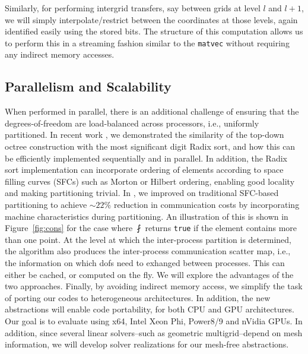 Similarly, for performing intergrid transfers, say between grids at level $l$ and $l+1$, we will simply interpolate/restrict between the coordinates at those levels, again identified easily using the stored bits. The structure of this computation allows us to perform this in a streaming fashion similar to the \texttt{matvec} without requiring any indirect memory accesses. 





\subsection{Parallelism and Scalability}

When performed in parallel, there is an additional challenge of ensuring that the degrees-of-freedom are load-balanced across processors, i.e., uniformly partitioned. In recent work \cite{FernandoDuplyakinSundar17}, we demonstrated the similarity of the top-down octree construction with the most significant digit Radix sort, and how this can be efficiently implemented sequentially and in parallel. In addition, the Radix sort implementation can incorporate ordering of elements according to space filling curves (SFCs) such as Morton or Hilbert ordering, enabling good locality and making partitioning trivial. In \cite{FernandoDuplyakinSundar17}, we improved on traditional SFC-based partitioning to achieve $\sim 22\%$ reduction in communication costs by incorporating machine characteristics during partitioning. An illustration of this is shown in Figure~\ref{fig:cons} for the case where $\fint$ returns \texttt{true} if the element contains more than one point. At the level at which the inter-process partition is determined, the algorithm also produces the inter-process communication scatter map, i.e., the information on which dofs need to exhanged between processes. This can either be cached, or computed on the fly. We will explore the advantages of the two approaches. Finally, by avoiding indirect memory access, we simplify the task of porting our codes to heterogeneous architectures.  
In addition, the new abstractions will enable code portability, for both CPU and GPU architectures. Our goal is to evaluate using x64, Intel Xeon Phi, Power8/9 and
nVidia GPUs. In addition, since several linear solvers–such as geometric multigrid–depend on mesh information, we will develop solver realizations for our mesh-free abstractions.

